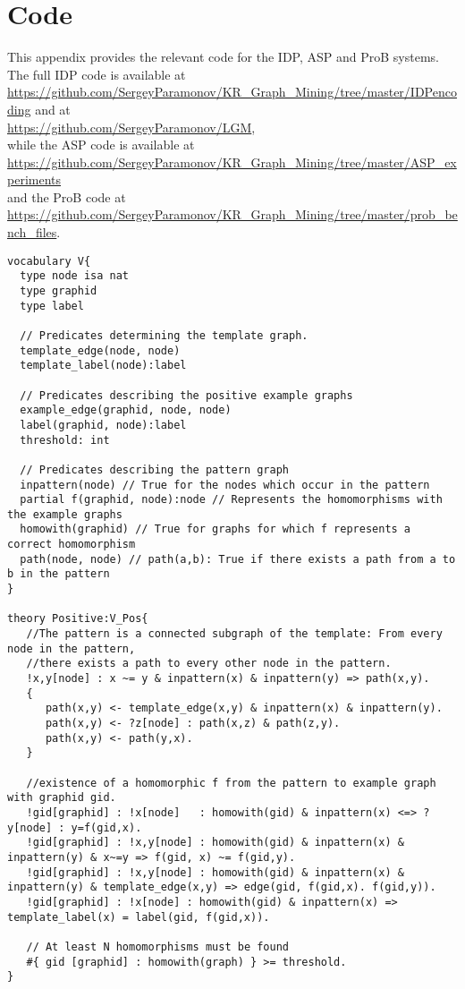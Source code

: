 \newpage
\appendix
\section{Code}
\label{app:Code}
This appendix provides the relevant code for the IDP, ASP and ProB systems.
The full IDP code is available at\\ \url{https://github.com/SergeyParamonov/KR_Graph_Mining/tree/master/IDPencoding} and at \\\url{https://github.com/SergeyParamonov/LGM},\\ while the ASP code is available at\\ \url{https://github.com/SergeyParamonov/KR_Graph_Mining/tree/master/ASP_experiments}\\ and the ProB code at \\\url{https://github.com/SergeyParamonov/KR_Graph_Mining/tree/master/prob_bench_files}. 
\begin{lstlisting}[caption=IDP positive constraint, style=model, label=lst:IDPPos]
vocabulary V{
  type node isa nat
  type graphid
  type label

  // Predicates determining the template graph.
  template_edge(node, node) 
  template_label(node):label

  // Predicates describing the positive example graphs
  example_edge(graphid, node, node)
  label(graphid, node):label
  threshold: int

  // Predicates describing the pattern graph
  inpattern(node) // True for the nodes which occur in the pattern
  partial f(graphid, node):node // Represents the homomorphisms with the example graphs
  homowith(graphid) // True for graphs for which f represents a correct homomorphism
  path(node, node) // path(a,b): True if there exists a path from a to b in the pattern
}

theory Positive:V_Pos{
   //The pattern is a connected subgraph of the template: From every node in the pattern, 
   //there exists a path to every other node in the pattern.
   !x,y[node] : x ~= y & inpattern(x) & inpattern(y) => path(x,y).
   {
      path(x,y) <- template_edge(x,y) & inpattern(x) & inpattern(y).
      path(x,y) <- ?z[node] : path(x,z) & path(z,y).
      path(x,y) <- path(y,x).
   }

   //existence of a homomorphic f from the pattern to example graph with graphid gid.
   !gid[graphid] : !x[node]   : homowith(gid) & inpattern(x) <=> ? y[node] : y=f(gid,x).
   !gid[graphid] : !x,y[node] : homowith(gid) & inpattern(x) & inpattern(y) & x~=y => f(gid, x) ~= f(gid,y).
   !gid[graphid] : !x,y[node] : homowith(gid) & inpattern(x) & inpattern(y) & template_edge(x,y) => edge(gid, f(gid,x). f(gid,y)).
   !gid[graphid] : !x[node] : homowith(gid) & inpattern(x) => template_label(x) = label(gid, f(gid,x)).

   // At least N homomorphisms must be found
   #{ gid [graphid] : homowith(graph) } >= threshold.
}
\end{lstlisting}


